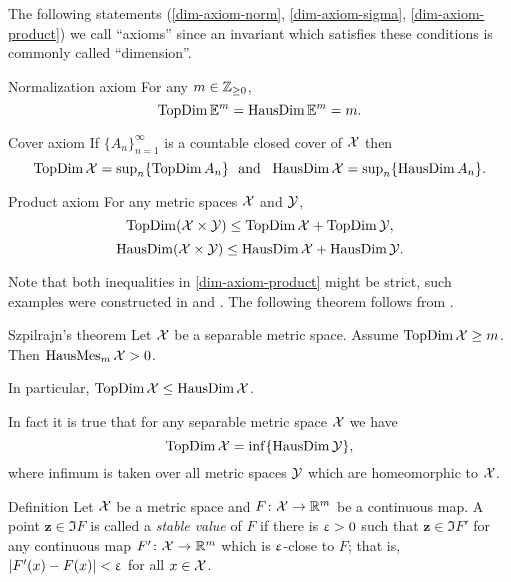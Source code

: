 The following statements (\ref{dim-axiom-norm}, \ref{dim-axiom-sigma}, \ref{dim-axiom-product}) we call ``axioms'' 
since an invariant which satisfies these conditions is commonly called ``dimension''.

\begin{thm}{Normalization axiom}
\label{dim-axiom-norm} For any $m\in\ZZ_{\ge0}$,
\[\mathop{\rm TopDim}\nolimits\mathbb{E}^m=\mathop{\rm HausDim}\nolimits\mathbb{E}^m=m.\]

\end{thm}

\begin{thm}{Cover axiom}
 \label{dim-axiom-sigma} If $\{A_n\}_{n=1}^\infty$ is a countable closed cover of $\mathcal{X}$ then
 \[\TopDim \spc{X}=\sup\nolimits_n\{\TopDim A_n\}\ \ \text{and}\ \ \HausDim \spc{X}=\sup\nolimits_n\{\HausDim A_n\}.\]

\end{thm}

\begin{thm}{Product axiom}\label{dim-axiom-product}
For any metric spaces $\mathcal{X}$ and $\mathcal{Y}$,
\[\TopDim  (\spc{X}\times\spc{Y})
\le 
\TopDim \spc{X}+ \TopDim\spc{Y},\]
\[\HausDim (\spc{X}\times\spc{Y})
\le 
\HausDim \spc{X}+ \HausDim\spc{Y}.\]

\end{thm}

Note that both inequalities in \ref{dim-axiom-product} might be strict, such examples were constructed in \cite{pontyagin-surface} and \cite{marstrand-hausdim}%
.
The following theorem follows from \cite[theorems V 8 and VII 2]{top-dim}.

\begin{thm}{Szpilrajn's theorem}\label{thm:szpilrajn} 
Let $\mathcal{X}$ be a separable metric space.
Assume $\TopDim\spc{X}\ge m$. Then $\mathop{\rm HausMes}\nolimits_m \mathcal{X}>0$.

In particular, 
$\TopDim\spc{X}\le\HausDim\spc{X}$.
\end{thm}

In fact it is true that for any separable metric space $\mathcal{X}$ we have
\[\mathop{\rm TopDim}\nolimits\mathcal{X}=\inf\{\mathop{\rm HausDim}\nolimits\mathcal{Y}\},\]
where infimum is taken over all metric spaces $\mathcal{Y}$ which are homeomorphic to $\mathcal{X}$.

\begin{thm}{Definition}
Let $\mathcal{X}$ be a metric space
and $F\:\spc{X}\to\RR^m$ be  a continuous map.
A point $\bm{z}\in \Im F$ is called a  \emph{stable value} of $F$
if there is $\upvarepsilon>0$ such that $\bm{z}\in\Im F'$ 
for any continuous map $F'\:\spc{X}\to\RR^m$ which is $\upvarepsilon$-close to $F$;
that is, $|F'(x)-F(x)|<\upvarepsilon$ for all $x\in \spc{X}$.
\end{thm}

